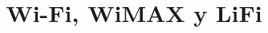 \documentclass[10pt,journal,compsoc]{IEEEtran}
\begin{document}
%
\title{Wi-Fi, WiMAX y LiFi}
%
%
%
%



% 
%
\end{document}

